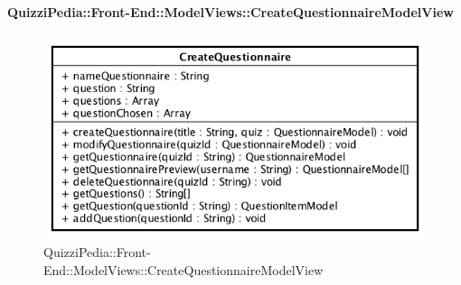 \paragraph{QuizziPedia::Front-End::ModelViews::CreateQuestionnaireModelView}
	
	\label{QuizziPedia::Front-End::ModelViews::CreateQuestionnaireModelView}
	
	\begin{figure}[ht]
		\centering
		\includegraphics[scale=0.5,keepaspectratio]{UML/Classi/Front-End/QuizziPedia_Front-end_ModelView_CreateQuestionnaireModelView.png}
		\caption{QuizziPedia::Front-End::ModelViews::CreateQuestionnaireModelView}
	\end{figure} \FloatBarrier
	
